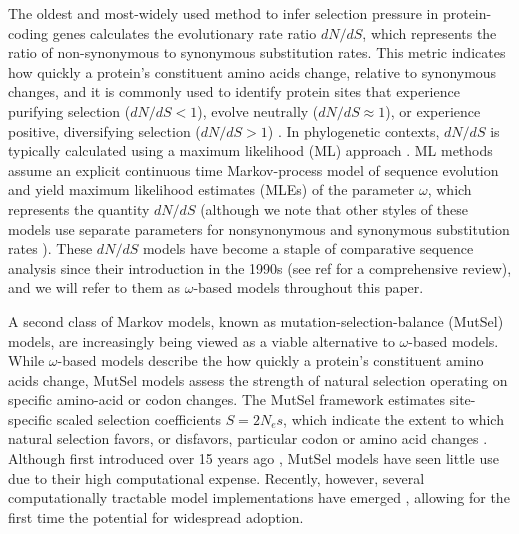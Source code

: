 \documentclass[11pt]{article}
\begin{document}
The oldest and most-widely used method to infer selection pressure in protein-coding genes calculates the evolutionary rate ratio $dN/dS$, which represents the ratio of non-synonymous to synonymous substitution rates. This metric indicates how quickly a protein's constituent amino acids change, relative to synonymous changes, and it is commonly used to identify protein sites that experience purifying selection ($dN/dS<1$), evolve neutrally ($dN/dS\approx1$), or experience positive, diversifying selection ($dN/dS>1$) \cite{NielsenYang1998, Yangetal2000, KosakovskyPondFrost2005b, Huelsenbecketal2006}. In phylogenetic contexts, $dN/dS$ is typically calculated using a maximum likelihood (ML) approach \cite{GoldmanYang1994,MuseGaut1994,NielsenYang1998,Yang2006}. ML methods assume an explicit continuous time Markov-process model of sequence evolution and yield maximum likelihood estimates (MLEs) of the parameter $\omega$, which represents the quantity $dN/dS$ (although we note that other styles of these models use separate parameters for nonsynonymous and synonymous substitution rates \cite{MuseGaut1994,KosakovskyPondMuse2005}). These $dN/dS$ models have become a staple of comparative sequence analysis since their introduction in the 1990s (see ref \cite{Anisimova2009} for a comprehensive review), and we will refer to them as $\omega$-based models throughout this paper.

A second class of Markov models, known as mutation-selection-balance (MutSel) models, are increasingly being viewed as a viable alternative to $\omega$-based models. While $\omega$-based models describe the how quickly a protein's constituent amino acids change, MutSel models assess the strength of natural selection operating on specific amino-acid or codon changes. The MutSel framework estimates site-specific scaled selection coefficients $S=2N_es$, which indicate the extent to which natural selection favors, or disfavors, particular codon or amino acid changes \cite{HalpernBruno1998,YangNielsen2008,Rodrigueetal2010,Tamurietal2012}. Although first introduced over 15 years ago \cite{HalpernBruno1998}, MutSel models have seen little use due to their high computational expense. Recently, however, several computationally tractable model implementations have emerged \cite{RodrigueLartillot2014,Tamurietal2014}, allowing for the first time the potential for widespread adoption.		
		
\end{document}
